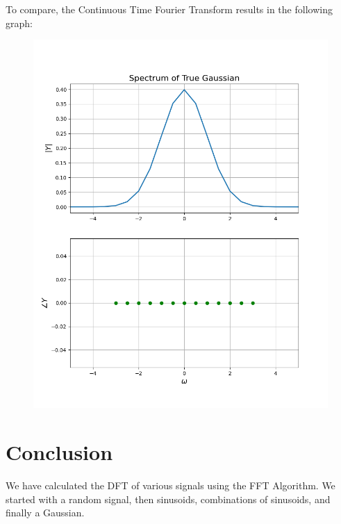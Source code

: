 \documentclass[12pt, a4paper]{article}
\begin{document}
To compare, the Continuous Time Fourier Transform results in the following graph:
\begin{figure}[H]
    \centering
    \includegraphics[scale=0.6]{q4b.png}
\end{figure}



\section{Conclusion}
We have calculated the DFT of various signals using the FFT Algorithm. We started with a random signal,
then sinusoids, combinations of sinusoids, and finally a Gaussian.
\end{document}
